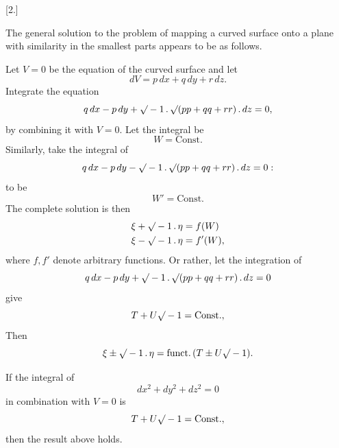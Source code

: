 %
\begin{center}[2.]\end{center}

The general solution to the problem of mapping a curved surface onto a plane with similarity in the smallest parts appears to be as follows.

Let $V=0$ be the equation of the curved surface and let
\[
dV=p\,dx+q\,dy+r\,dz.
\]
Integrate the equation
\[
q\,dx-p\,dy+\mathord{\surd}-1\,.\,\mathord{\surd}(pp+qq+rr)\,.\,dz=0,
\]
by combining it with $V=0$. Let the integral be
\[
W=\mathrm{Const.}
\]
Similarly, take the integral of
\[
q\,dx-p\,dy-\mathord{\surd}-1\,.\,\mathord{\surd}(pp+qq+rr)\,.\,dz=0:
\]
to be
\[
W'=\mathrm{Const.}
\]
The complete solution is then
\[
\begin{aligned}
\xi+\mathord{\surd}-1\,.\,\eta&=f(W)\\
\xi-\mathord{\surd}-1\,.\,\eta&=f'(W),
\end{aligned}
\]
where $f,f'$ denote arbitrary functions. Or rather, let the integration of
\[
q\,dx-p\,dy+\mathord{\surd}-1\,.\,\mathord{\surd}(pp+qq+rr)\,.\,dz=0
\]
give
\[
T+U\mathord{\surd}-1=\mathrm{Const.},
\]
Then
\[
\xi\pm\mathord{\surd}-1\,.\,\eta=\mathrm{funct.}\,(T\pm U\mathord{\surd}-1).
\]

If the integral of
\[
dx^2+dy^2+dz^2=0
\]
in combination with $V=0$ is
\[
T+U\mathord{\surd}-1=\mathrm{Const.},
\]
then the result above holds.
